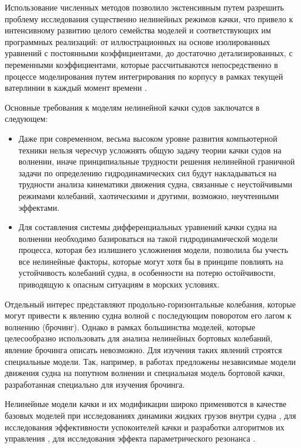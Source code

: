 Использование численных методов позволило экстенсивным путем разрешить проблему исследования существенно нелинейных режимов качки, что привело к интенсивному развитию целого семейства моделей и соответствующих им программных реализаций: от иллюстрационных \citep{dk19}\citep{dk20} на основе изолированных уравнений с постоянными коэффициентами, до достаточно детализированных, с переменными коэффициентами, которые рассчитываются непосредственно в процессе моделирования путем интегрирования по корпусу в рамках текущей ватерлинии в каждый момент времени \citep{dk21}.

Основные требования к моделям нелинейной качки судов заключатся в следующем: 
\begin{itemize}
	\item Даже при современном, весьма высоком уровне развития компьютерной техники нельзя чересчур усложнять общую задачу теории качки судов на волнении, иначе принципиальные трудности решения нелинейной граничной задачи по определению гидродинамических сил будут накладываться на трудности анализа кинематики движения судна, связанные с неустойчивыми режимами колебаний, хаотическими и другими, возможно, неучтенными эффектами.
	\item Для составления системы дифференциальных уравнений качки судна на волнении необходимо базироваться на такой гидродинамической модели процесса, которая без излишнего усложнения модели, позволила бы учесть все нелинейные факторы, которые могут хотя бы в принципе повлиять на устойчивость колебаний судна, в особенности на потерю остойчивости, приводящую к опасным ситуациям в морских условиях.
\end{itemize}

Отдельный интерес представляют продольно-горизонтальные колебания, которые могут привести к явлению  судна волной с последующим поворотом его лагом к волнению (брочинг). Однако в рамках большинства моделей, которые целесообразно использовать для анализа нелинейных бортовых колебаний, явление брочинга описать невозможно. Для изучения таких явлений строятся специальные модели. Так, например, в работах \citep{dk23}\citep{dk24} предложены независимые модели движения судна на попутном волнении и специальная модель бортовой качки, разработанная специально для изучения брочинга. 

Нелинейные модели качки и их модификации широко применяются в качестве базовых моделей при исследованиях динамики жидких грузов внутри судна \citep{dk25}\citep{dk26}, для исследования эффективности успокоителей качки и разработки алгоритмов их управления \citep{dk27}\citep{dk28}\citep{dk29}, для исследования эффекта параметрического резонанса \citep{dk30}.

